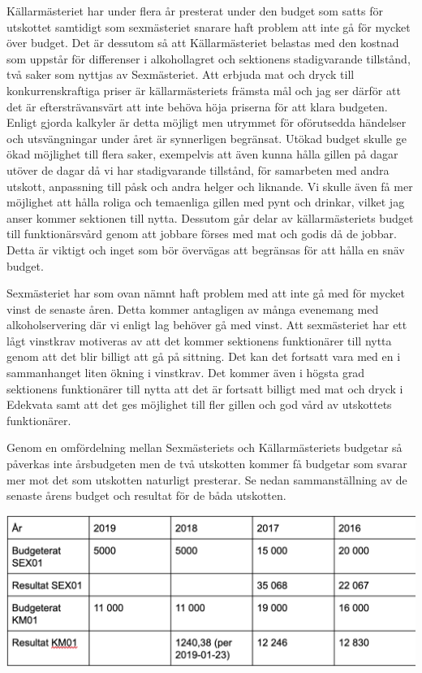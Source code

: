 \documentclass[../_main/handlingar.tex]{subfiles}
\begin{document}

    Källarmästeriet har under flera år presterat under den budget som satts för utskottet samtidigt som sexmästeriet snarare haft problem att inte gå för mycket över budget. Det är dessutom så att Källarmästeriet belastas med den kostnad som uppstår för differenser i alkohollagret och sektionens stadigvarande tillstånd, två saker som nyttjas av Sexmästeriet. Att erbjuda mat och dryck till konkurrenskraftiga priser är källarmästeriets främsta mål och jag ser därför att det är eftersträvansvärt att inte behöva höja priserna för att klara budgeten. Enligt gjorda kalkyler är detta möjligt men utrymmet för oförutsedda händelser och utsvängningar under året är synnerligen begränsat. Utökad budget skulle ge ökad möjlighet till flera saker, exempelvis att även kunna hålla gillen på dagar utöver de dagar då vi har stadigvarande tillstånd, för samarbeten med andra utskott, anpassning till påsk och andra helger och liknande. Vi skulle även få mer möjlighet att hålla roliga och temaenliga gillen med pynt och drinkar, vilket jag anser kommer sektionen till nytta. Dessutom går delar av källarmästeriets budget till funktionärsvård genom att jobbare förses med mat och godis då de jobbar. Detta är viktigt och inget som bör övervägas att begränsas för att hålla en snäv budget. 

Sexmästeriet har som ovan nämnt haft problem med att inte gå med för mycket vinst de senaste åren. Detta kommer antagligen av många evenemang med alkoholservering där vi enligt lag behöver gå med vinst. Att sexmästeriet har ett lågt vinstkrav motiveras av att det kommer sektionens funktionärer till nytta genom att det blir billigt att gå på sittning. Det kan det fortsatt vara med en i sammanhanget liten ökning i vinstkrav. Det kommer även i högsta grad sektionens funktionärer till nytta att det är fortsatt billigt med mat och dryck i Edekvata samt att det ges möjlighet till fler gillen och god vård av utskottets funktionärer.  

Genom en omfördelning mellan Sexmästeriets och Källarmästeriets budgetar så påverkas inte årsbudgeten men de två utskotten kommer få budgetar som svarar mer mot det som utskotten naturligt presterar. Se nedan sammanställning av de senaste årens budget och resultat för de båda utskotten.


    \begin{center}
        \includegraphics[scale=0.5]{../_res/budget_resultat.jpg}
    \end{center}
\end{document}
